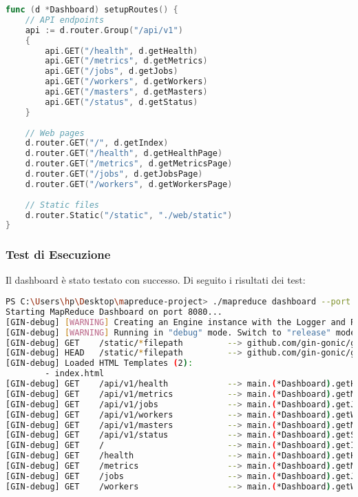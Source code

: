 \documentclass[12pt,a4paper]{article}
\begin{document}
\begin{lstlisting}[language=go, caption=Configurazione delle Route]
func (d *Dashboard) setupRoutes() {
    // API endpoints
    api := d.router.Group("/api/v1")
    {
        api.GET("/health", d.getHealth)
        api.GET("/metrics", d.getMetrics)
        api.GET("/jobs", d.getJobs)
        api.GET("/workers", d.getWorkers)
        api.GET("/masters", d.getMasters)
        api.GET("/status", d.getStatus)
    }
    
    // Web pages
    d.router.GET("/", d.getIndex)
    d.router.GET("/health", d.getHealthPage)
    d.router.GET("/metrics", d.getMetricsPage)
    d.router.GET("/jobs", d.getJobsPage)
    d.router.GET("/workers", d.getWorkersPage)
    
    // Static files
    d.router.Static("/static", "./web/static")
}
\end{lstlisting}

\subsubsection{Test di Esecuzione}

Il dashboard è stato testato con successo. Di seguito i risultati dei test:

\begin{lstlisting}[language=bash, caption=Test di Avvio Dashboard]
PS C:\Users\hp\Desktop\mapreduce-project> ./mapreduce dashboard --port 8080
Starting MapReduce Dashboard on port 8080...
[GIN-debug] [WARNING] Creating an Engine instance with the Logger and Recovery middleware already attached.
[GIN-debug] [WARNING] Running in "debug" mode. Switch to "release" mode in production.
[GIN-debug] GET    /static/*filepath         --> github.com/gin-gonic/gin.(*RouterGroup).createStaticHandler.func1 (3 handlers)
[GIN-debug] HEAD   /static/*filepath         --> github.com/gin-gonic/gin.(*RouterGroup).createStaticHandler.func1 (3 handlers)
[GIN-debug] Loaded HTML Templates (2):
        - index.html
[GIN-debug] GET    /api/v1/health            --> main.(*Dashboard).getHealth-fm (3 handlers)
[GIN-debug] GET    /api/v1/metrics           --> main.(*Dashboard).getMetrics-fm (3 handlers)
[GIN-debug] GET    /api/v1/jobs              --> main.(*Dashboard).getJobs-fm (3 handlers)
[GIN-debug] GET    /api/v1/workers           --> main.(*Dashboard).getWorkers-fm (3 handlers)
[GIN-debug] GET    /api/v1/masters           --> main.(*Dashboard).getMasters-fm (3 handlers)
[GIN-debug] GET    /api/v1/status            --> main.(*Dashboard).getStatus-fm (3 handlers)
[GIN-debug] GET    /                         --> main.(*Dashboard).getIndex-fm (3 handlers)
[GIN-debug] GET    /health                   --> main.(*Dashboard).getHealthPage-fm (3 handlers)
[GIN-debug] GET    /metrics                  --> main.(*Dashboard).getMetricsPage-fm (3 handlers)
[GIN-debug] GET    /jobs                     --> main.(*Dashboard).getJobsPage-fm (3 handlers)
[GIN-debug] GET    /workers                  --> main.(*Dashboard).getWorkersPage-fm (3 handlers)
\end{lstlisting}
\end{document}
